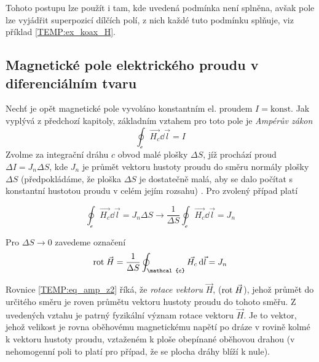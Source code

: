       Tohoto postupu lze použít i tam, kde uvedená podmínka není splněna, avšak pole lze vyjádřit
      superpozicí dílčích polí, z nich každé tuto podmínku splňuje, viz příklad 
      \ref{TEMP:ex_koax_H}. 

        

        

    \subsection{Magnetické pole elektrického proudu v diferenciálním tvaru}
      Nechť je opět magnetické pole vyvoláno konstantním el. proudem $I = \text{konst}$. Jak
      vyplývá z předchozí kapitoly, základním vztahem pro toto pole je \emph{Ampérův zákon}
      $$\oint_{\mathcal{c}}\vec{H_c}\dd{\vec{l}} = I$$  Zvolme za integrační dráhu $c$ obvod malé plošky
      $\Delta S$, jíž prochází proud $\Delta I = J_n \Delta S$, kde $J_n$ je průmět vektoru hustoty
      proudu do směru normály plošky $\Delta S$ (předpokládáme, že ploška $\Delta S$ je dostatečně
      malá, aby se dalo počítat s konstantní hustotou proudu v celém jejím rozsahu)
      \cite[s.~13]{Trnka1972}. Pro zvolený případ platí
      
      \begin{equation}\label{TEMP:eq_amp_z1}
        \oint_{\mathcal{c}}\vec{H_c}\dd{\vec{l}}  =
          J_n \Delta S \rightarrow \frac{1}{\Delta S}\oint_{\mathcal{c}}\vec{H_c}\dd{\vec{l}} = J_n
      \end{equation} 
      
      Pro $\Delta S \rightarrow 0$ zavedeme označení 
      \begin{equation}\label{TEMP:eq_amp_z2}
        \rot{H}  = \frac{1}{\Delta S}\oint_{\mathcal{c}}\vec{H_c}\dd{\vec{l}}  = J_n
      \end{equation}
      
      Rovnice \ref{TEMP:eq_amp_z2} říká, že \emph{rotace vektoru} $\vec{H}$, ($\mathrm{rot}\;\vec{H}$), jehož
      průmět do určitého směru je roven průmětu vektoru hustoty proudu do tohoto směřu. Z uvedených
      vztahu je patrný fyzikální význam rotace vektoru $\vec{H}$. Je to vektor, jehož velikost je
      rovna oběhovému magnetickému napětí po dráze v rovině kolmé k vektoru hustoty proudu,
      vztaženém k ploše obepínané oběhovou drahou (v nehomogenní poli to platí pro případ, že se
      plocha dráhy blíží k nule).
      
